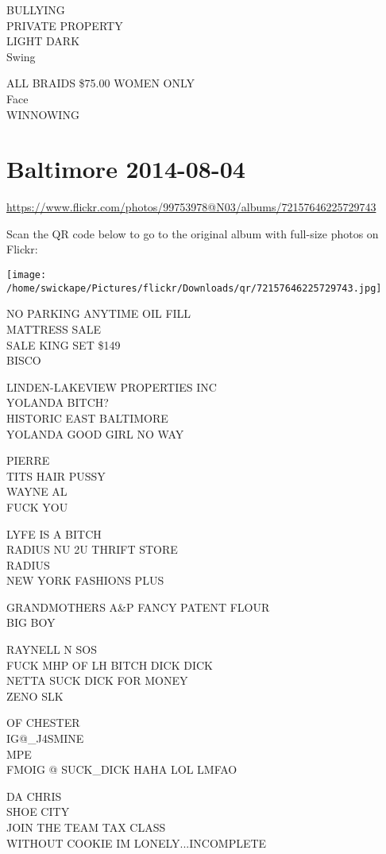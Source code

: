 \documentclass[10pt,letterpaper]{article}
\begin{document}
BULLYING\\
PRIVATE PROPERTY\\
LIGHT DARK\\
Swing

ALL BRAIDS \$75.00 WOMEN ONLY\\
Face\\
WINNOWING
\pagebreak

\section*{Baltimore 2014-08-04}

\url{https://www.flickr.com/photos/99753978@N03/albums/72157646225729743}

Scan the QR code below to go to the original album with full-size photos on Flickr:

\texttt{[image: /home/swickape/Pictures/flickr/Downloads/qr/72157646225729743.jpg]}
\pagebreak

NO PARKING ANYTIME OIL FILL\\
MATTRESS SALE\\
SALE KING SET \$149\\
BISCO

LINDEN{-}LAKEVIEW PROPERTIES INC\\
YOLANDA BITCH?\\
HISTORIC EAST BALTIMORE\\
YOLANDA GOOD GIRL NO WAY

PIERRE\\
TITS HAIR PUSSY\\
WAYNE AL\\
FUCK YOU

LYFE IS A BITCH\\
RADIUS NU 2U THRIFT STORE\\
RADIUS\\
NEW YORK FASHIONS PLUS

GRANDMOTHERS A\&P FANCY PATENT FLOUR\\
BIG BOY

RAYNELL N SOS\\
FUCK MHP OF LH BITCH DICK DICK\\
NETTA SUCK DICK FOR MONEY\\
ZENO SLK

OF CHESTER\\
IG@\_J4SMINE\\
MPE\\
FMOIG @ SUCK\_DICK HAHA LOL LMFAO

DA CHRIS\\
SHOE CITY\\
JOIN THE TEAM TAX CLASS\\
WITHOUT COOKIE IM LONELY...INCOMPLETE
\end{document}
